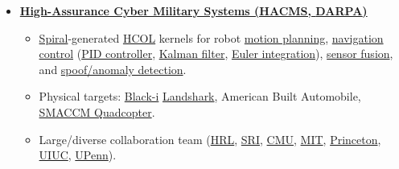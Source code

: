 \documentclass{article}
\begin{document}
\begin{itemize}

\item \textbf{\href{http://www.darpa.mil/Our_Work/I2O/Programs/High-Assurance_Cyber_Military_Systems_(HACMS).aspx}{High-Assurance Cyber Military Systems (HACMS, \href{http://www.darpa.mil/default.aspx}{DARPA})}}


  \begin{itemize}
    \item \href{http://spiral.net/}{Spiral}-generated \href{https://wiki.hh.se/wg211/images/e/e0/M13Franchetti.pdf}{HCOL} kernels for robot \href{https://en.wikipedia.org/wiki/Motion_planning}{motion planning}, \href{https://en.wikipedia.org/wiki/Mobile_robot_navigation}{navigation control} (\href{http://en.wikipedia.org/wiki/PID_controller}{PID controller}, \href{https://en.wikipedia.org/wiki/Kalman_filter}{Kalman filter}, \href{http://en.wikipedia.org/wiki/Euler_method}{Euler integration}), \href{https://en.wikipedia.org/wiki/Sensor_fusion}{sensor fusion}, and \href{https://en.wikipedia.org/wiki/Anomaly_detection}{spoof/anomaly detection}.



    \item Physical targets: \href{http://blackirobotics.com/DARPA-SN-12-26_HACMS.php}{Black-i} \href{http://www.blackirobotics.com/LandShark_UGV_UC0M.html}{Landshark}, American Built Automobile, \href{http://smaccmpilot.org/}{SMACCM Quadcopter}. 

    \item Large/diverse collaboration team (\href{http://www.hrl.com/}{HRL}, \href{http://www.sri.com/}{SRI}, \href{http://www.cmu.edu/}{CMU}, \href{http://web.mit.edu/}{MIT}, \href{http://www.princeton.edu/}{Princeton}, \href{http://illinois.edu/}{UIUC}, \href{http://www.upenn.edu/}{UPenn}).


\end{itemize}
\end{itemize}
\end{document}
